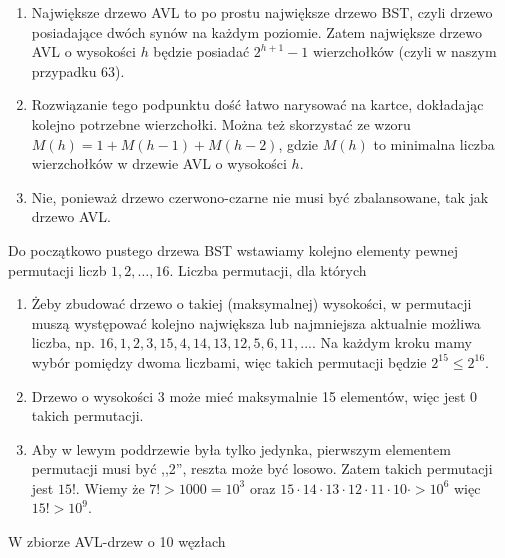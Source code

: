 \begin{solutions}
    \begin{enumerate}[\bf A.]
        \item Największe drzewo AVL to po prostu największe drzewo BST, czyli drzewo posiadające dwóch synów na każdym poziomie. Zatem największe drzewo AVL o wysokości $h$ będzie posiadać $2^{h+1} - 1$ wierzchołków (czyli w naszym przypadku 63).

        \item Rozwiązanie tego podpunktu dość łatwo narysować na kartce, dokładając kolejno potrzebne wierzchołki. Można też skorzystać ze wzoru $M(h) = 1 + M(h-1) + M(h-2)$, gdzie $M(h)$ to minimalna liczba wierzchołków w drzewie AVL o wysokości $h$.

        \item Nie, ponieważ drzewo czerwono-czarne nie musi być zbalansowane, tak jak drzewo AVL.
    \end{enumerate}

    \sol Do początkowo pustego drzewa BST wstawiamy kolejno elementy pewnej permutacji liczb $1,2,\ldots,16$. Liczba permutacji, dla których

    \begin{enumerate}[\bf A.]
        \item Żeby zbudować drzewo o takiej (maksymalnej) wysokości, w permutacji muszą występować kolejno największa lub najmniejsza aktualnie możliwa liczba, np. $16,1,2,3,15,4,14,13,12,5,6,11,...$. Na każdym kroku mamy wybór pomiędzy dwoma liczbami, więc takich permutacji będzie $2^{15} \leq 2^{16}$.

        \item Drzewo o wysokości 3 może mieć maksymalnie 15 elementów, więc jest 0 takich permutacji.

        \item Aby w lewym poddrzewie była tylko jedynka, pierwszym elementem permutacji musi być ,,2'', reszta może być losowo. Zatem takich permutacji jest $15!$. Wiemy że $7! > 1000 = 10^3$ oraz $15\cdot 14\cdot 13\cdot 12\cdot 11\cdot 10\cdot > 10^6$ więc $15! > 10^9$.
    \end{enumerate}

    \sol W zbiorze AVL-drzew o 10 węzłach


\end{solutions}

